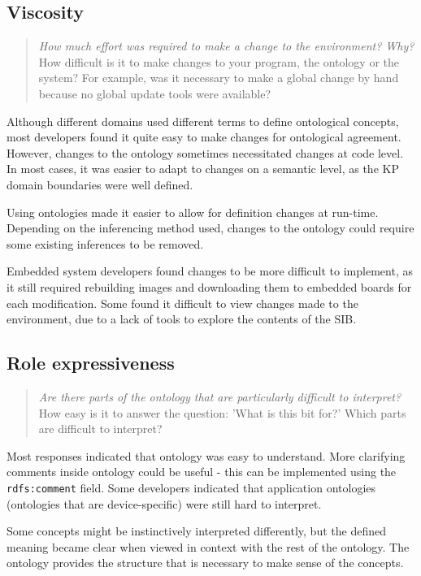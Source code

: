\subsection{Viscosity}

\begin{quote}
	\emph{How much effort was required to make a change to the environment? Why?}
	How difficult is it to make changes to your program, the ontology or the system? For example, was it necessary to make a global change by hand because no global update tools were available?
\end{quote}

Although different domains used different terms to define ontological concepts, most developers found it quite easy to make changes for ontological agreement. However, changes to the ontology sometimes necessitated changes at code level. In most cases, it was easier to adapt to changes on a semantic level, as the KP domain boundaries were well defined.

Using ontologies made it easier to allow for definition changes at run-time. Depending on the inferencing method used, changes to the ontology could require some existing inferences to be removed. 

Embedded system developers found changes to be more difficult to implement, as it still required rebuilding images and downloading them to embedded boards for each modification. Some found it difficult to view changes made to the environment, due to a lack of tools to explore the contents of the SIB.


\subsection{Role expressiveness}

\begin{quote}
	\emph{Are there parts of the ontology that are particularly difficult to interpret?}
	How easy is it to answer the question: 'What is this bit for?' Which parts are difficult to interpret?
\end{quote}

Most responses indicated that ontology was easy to understand. More clarifying comments inside ontology could be useful - this can be implemented using the \texttt{rdfs:comment} field. Some developers indicated that application ontologies (ontologies that are device-specific) were still hard to interpret. 

Some concepts might be instinctively interpreted differently, but the defined meaning became clear when viewed in context with the rest of the ontology. The ontology provides the structure that is necessary to make sense of the concepts.


